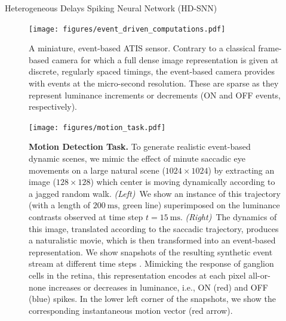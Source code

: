 \documentclass[final]{beamer}
\newcommand{\ms}{\si{\milli\second}}%
\newlength{\sepwidth}
\newlength{\colwidth}
\newcommand{\separatorcolumn}{\begin{column}{\sepwidth}\end{column}}
\begin{document}
\begin{frame}[t]
\begin{columns}[t]
\begin{column}{\colwidth}
\begin{block}{Heterogeneous Delays Spiking Neural Network (HD-SNN)~\textcite{Grimaldi23BC}}
\begin{figure}%
	{ \centering
	\texttt{[image: figures/event\_driven\_computations.pdf]}
	\caption{\small %
	A miniature, event-based ATIS sensor. Contrary to a classical frame-based camera for which a full dense image representation is given at discrete, regularly spaced timings, the event-based camera provides with events at the micro-second resolution. These are sparse as they represent luminance increments or decrements (ON and OFF events, respectively).
	}
	\label{fig:silicon_retina}
		}
\end{figure}
\begin{figure}%
    \centering
    \texttt{[image: figures/motion\_task.pdf]}
    \caption{
        {\bf Motion Detection Task.} To generate realistic event-based dynamic scenes, we mimic the effect of minute saccadic eye movements on a large natural scene ($1024\times1024$) by extracting an image ($128\times128$) which center is moving dynamically according to a jagged random walk. \textit{(Left)}~We show an instance of this trajectory (with a length of $200~\ms$, green line) superimposed on the luminance contrasts observed at time step $t=15~\ms$. \textit{(Right)}~The dynamics of this image, translated according to the saccadic trajectory, produces a naturalistic movie, which is then transformed into an event-based representation. We show snapshots of the resulting synthetic event stream at different time steps .%
         Mimicking the response of ganglion cells in the retina, this representation encodes at each pixel all-or-none increases or decreases in luminance, i.e., ON (red) and OFF (blue) spikes. In the lower left corner of the snapshots, we show the corresponding instantaneous motion vector (red arrow). %
        }
    \label{fig:motion_task}
\end{figure}

\begin{columns}[t]
\separatorcolumn


\end{columns}
\end{block}
\end{column}
\end{columns}
\end{frame}
\end{document}
